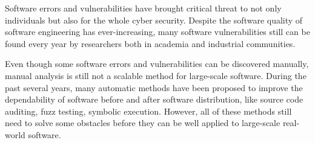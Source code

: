 \begin{comment}
1. What are the problems I want to solve/ease ?
    Traditional fuzz testing is blind when testing complex and large-scale software. Coverage based fuzz testing makes traditional one smarter by mutating test cases that trigger new behaviors. 
    
    However, this still faces two problems:
        i) For large software, the test case queue will become huge, so how to schedule the seed files to find more paths under the time budget?
        
        ii) For complex software, most bugs are deeply nested in some complex code areas. Using fuzz testing alone will be very hard to trigger such code. Hybrid testing, like using symbex to assist fuzz testing, will benefit from all the advantages and mitigate the disadvantages of the multiple methods. When using symbex, some program structures (sym-loops) and instructions (sym-pointer-derefs) will result huge number of useless states which will consume the test resources.
        
2. What is my solution(s) ? [1 para]
    i) Distance based seed prioritization method
    ii) SLB and LSP
3. What are my contributions ? [1 para/ less than three items]
    i) Proposed DSP method
    ii) Proposed SLB and LSP
4. What is the road map?
    XXX
\end{comment}

Software errors and vulnerabilities have brought critical threat to not only individuals but also for the whole cyber security. Despite the software quality of software engineering has ever-increasing, many software vulnerabilities still can be found every year by researchers both in academia and industrial communities. 

Even though some software errors and vulnerabilities can be discovered manually, manual analysis is still not a scalable method for large-scale software. During the past several years, many automatic methods have been proposed to improve the dependability of software before and after software distribution, like source code auditing, fuzz testing, symbolic execution. However, all of these methods still need to solve some obstacles before they can be well applied to large-scale real-world software.

